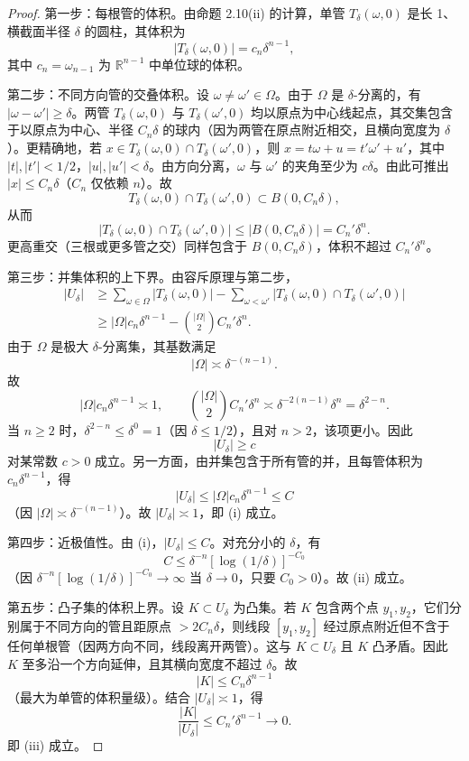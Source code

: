 \documentclass[11pt,a4paper]{article}
\theoremstyle{remark}
\begin{document}
		\begin{proof}
		第一步：每根管的体积。由命题 2.10(ii) 的计算，单管 $T_\delta(\omega,0)$ 是长 1、横截面半径 $\delta$ 的圆柱，其体积为
		\[|T_\delta(\omega,0)|=c_n\delta^{n-1},\]
		其中 $c_n=\omega_{n-1}$ 为 $\mathbb R^{n-1}$ 中单位球的体积。
		
		第二步：不同方向管的交叠体积。设 $\omega\neq\omega'\in\Omega$。由于 $\Omega$ 是 $\delta$-分离的，有 $|\omega-\omega'|\ge\delta$。两管 $T_\delta(\omega,0)$ 与 $T_\delta(\omega',0)$ 均以原点为中心线起点，其交集包含于以原点为中心、半径 $C_n\delta$ 的球内（因为两管在原点附近相交，且横向宽度为 $\delta$）。更精确地，若 $x\in T_\delta(\omega,0)\cap T_\delta(\omega',0)$，则 $x=t\omega+u=t'\omega'+u'$，其中 $|t|,|t'|<1/2$，$|u|,|u'|<\delta$。由方向分离，$\omega$ 与 $\omega'$ 的夹角至少为 $c\delta$。由此可推出 $|x|\le C_n\delta$（$C_n$ 仅依赖 $n$）。故
		\[T_\delta(\omega,0)\cap T_\delta(\omega',0)\subset B(0,C_n\delta),\]
		从而
		\[|T_\delta(\omega,0)\cap T_\delta(\omega',0)|\le|B(0,C_n\delta)|=C_n'\delta^n.\]
		更高重交（三根或更多管之交）同样包含于 $B(0,C_n\delta)$，体积不超过 $C_n'\delta^n$。
		
		第三步：并集体积的上下界。由容斥原理与第二步，
		\[ 
			\begin{aligned}
				|U_\delta|&\ge\sum_{\omega\in\Omega}|T_\delta(\omega,0)|-\sum_{\omega<\omega'}|T_\delta(\omega,0)\cap T_\delta(\omega',0)|\\
				&\ge|\Omega|c_n\delta^{n-1}-\binom{|\Omega|}{2}C_n'\delta^n.
			\end{aligned}
		\]
		由于 $\Omega$ 是极大 $\delta$-分离集，其基数满足
		\[|\Omega|\asymp\delta^{-(n-1)}.\]
		故
		\[|\Omega|c_n\delta^{n-1}\asymp1,\qquad
		\binom{|\Omega|}{2}C_n'\delta^n\asymp\delta^{-2(n-1)}\delta^n=\delta^{2-n}.\]
		当 $n\ge2$ 时，$\delta^{2-n}\le\delta^0=1$（因 $\delta\le1/2$），且对 $n>2$，该项更小。因此
		\[|U_\delta|\ge c\]
		对某常数 $c>0$ 成立。另一方面，由并集包含于所有管的并，且每管体积为 $c_n\delta^{n-1}$，得
		\[|U_\delta|\le|\Omega|c_n\delta^{n-1}\le C\]
		（因 $|\Omega|\asymp\delta^{-(n-1)}$）。故 $|U_\delta|\asymp1$，即 (i) 成立。
		
		第四步：近极值性。由 (i)，$|U_\delta|\le C$。对充分小的 $\delta$，有
		\[C\le\delta^{-n}[\log(1/\delta)]^{-C_0}\]
		（因 $\delta^{-n}[\log(1/\delta)]^{-C_0}\to\infty$ 当 $\delta\to0$，只要 $C_0>0$）。故 (ii) 成立。
		
		第五步：凸子集的体积上界。设 $K\subset U_\delta$ 为凸集。若 $K$ 包含两个点 $y_1,y_2$，它们分别属于不同方向的管且距原点 $>2C_n\delta$，则线段 $[y_1,y_2]$ 经过原点附近但不含于任何单根管（因两方向不同，线段离开两管）。这与 $K\subset U_\delta$ 且 $K$ 凸矛盾。因此 $K$ 至多沿一个方向延伸，且其横向宽度不超过 $\delta$。故
		\[|K|\le C_n\delta^{n-1}\]
		（最大为单管的体积量级）。结合 $|U_\delta|\asymp1$，得
		\[\frac{|K|}{|U_\delta|}\le C_n'\delta^{n-1}\to0.\]
		即 (iii) 成立。
		

\end{proof}
\end{document}
